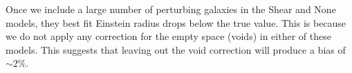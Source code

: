 Once we include a large number of perturbing galaxies in the Shear and None models, they best fit Einstein radius drops below the true value. This is because we do not apply any correction for the empty space (voids) in either of these models. This suggests that leaving out the void correction will produce a bias of $\sim 2\%$.
  
